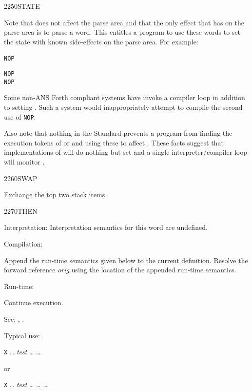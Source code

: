 \begin{newword}{2250}{STATE}
\begin{rationale}
		Note that \word{]} does not affect the parse area and that the
		only effect that \word{:} has on the parse area is to parse a
		word. This entitles a program to use these words to set the
		state with known side-effects on the parse area. For example:

		\tab \word{:} \texttt{NOP}~
			\word{:}  \word{;} 
		\word{;}

		\tab \texttt{NOP}  \\
		\tab \texttt{NOP} 

		Some non-ANS Forth compliant systems have \word{]} invoke a
		compiler loop in addition to setting . Such a
		system would inappropriately attempt to compile the second
		use of \texttt{NOP}.

		Also note that nothing in the Standard prevents a program from
		finding the execution tokens of \word{]} or \word{[} and using
		these to affect . These facts suggest that
		implementations of \word{]} will do nothing but set 
		and a single interpreter/compiler loop will monitor .
	\end{rationale}
\end{newword}


\begin{newword}{2260}{SWAP}

	Exchange the top two stack items.
\end{newword}


\begin{newword*}{2270}{THEN}
\item[Interpretation:]
	Interpretation semantics for this word are undefined.

\item[Compilation:]

	Append the run-time semantics given below to the current
	definition. Resolve the forward reference \emph{orig} using
	the location of the appended run-time semantics.

\item[Run-time:]
	\stack{}{}

	Continue execution.

\item[See:]
	,
	.

	\begin{rationale} %
		Typical use:

		\tab \word{:} \texttt{X} {\ldots}
			\emph{test}  {\ldots} 
		{\ldots} \word{;}

		or

		\tab \word{:} \texttt{X} {\ldots}
			\emph{test}  {\ldots}  {\ldots} 
		{\ldots} \word{;}
	\end{rationale}
\end{newword*}


